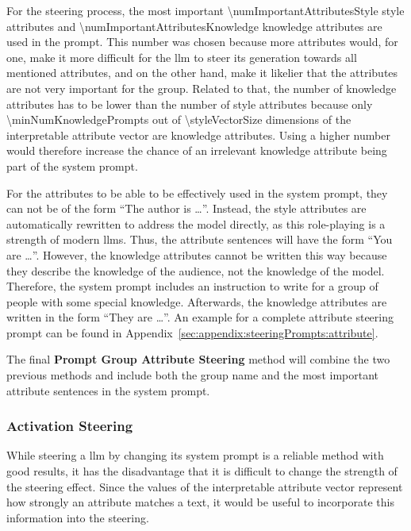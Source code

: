 For the steering process, the most important \num{\numImportantAttributesStyle} style attributes and \num{\numImportantAttributesKnowledge} knowledge attributes are used in the prompt. This number was chosen because more attributes would, for one, make it more difficult for the \ac{llm} to steer its generation towards all mentioned attributes, and on the other hand, make it likelier that the attributes are not very important for the group. Related to that, the number of knowledge attributes has to be lower than the number of style attributes because only \num{\minNumKnowledgePrompts} out of \num{\styleVectorSize} dimensions of the interpretable attribute vector are knowledge attributes. Using a higher number would therefore increase the chance of an irrelevant knowledge attribute being part of the system prompt.

For the attributes to be able to be effectively used in the system prompt, they can not be of the form \enquote{The author is \ldots}. Instead, the style attributes are automatically rewritten to address the model directly, as this role-playing is a strength of modern \aclp{llm}. %
Thus, the attribute sentences will have the form \enquote{You are \ldots}.
However, the knowledge attributes cannot be written this way because they describe the knowledge of the audience, not the knowledge of the model. Therefore, the system prompt includes an instruction to write for a group of people with some special knowledge. Afterwards, the knowledge attributes are written in the form \enquote{They are \ldots}. An example for a complete attribute steering prompt can be found in Appendix~\ref{sec:appendix:steeringPrompts:attribute}. %

The final \textbf{Prompt Group Attribute Steering} method will combine the two previous methods and include both the group name and the most important attribute sentences in the system prompt.


\subsubsection{Activation Steering}
\label{sec:experiments:setup:steering:activation}
While steering a \ac{llm} by changing its system prompt is a reliable method with good results, it has the disadvantage that it is difficult to change the strength of the steering effect. Since the values of the interpretable attribute vector represent how strongly an attribute matches a text, it would be useful to incorporate this information into the steering.

